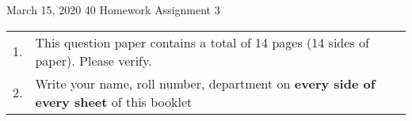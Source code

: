 \documentclass[a4paper, 12pt]{article}
\begin{document}
\vspace*{14ex}

           {March 15, 2020}      					         		%
					 {40}											%
					 {Homework Assignment 3}							%
					
\begin{tabular}{cl}
1. & This question paper contains a total of 14 pages (14 sides of paper). Please verify.\\
2. & Write your name, roll number, department on \textbf{every side of every sheet} of this booklet\\
\end{tabular}
\end{document}
